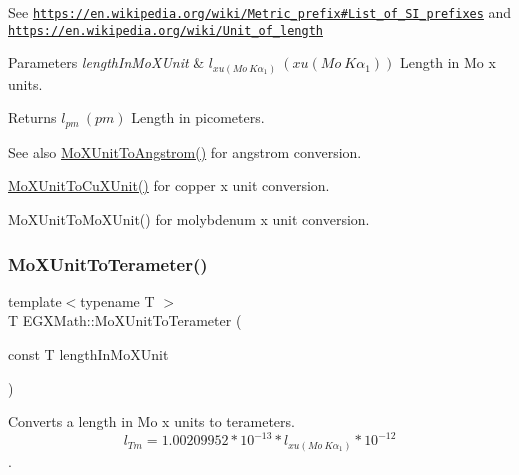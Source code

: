 See \href{https://en.wikipedia.org/wiki/Metric_prefix#List_of_SI_prefixes}{\tt https\+://en.\+wikipedia.\+org/wiki/\+Metric\+\_\+prefix\#\+List\+\_\+of\+\_\+\+S\+I\+\_\+prefixes} and \href{https://en.wikipedia.org/wiki/Unit_of_length}{\tt https\+://en.\+wikipedia.\+org/wiki/\+Unit\+\_\+of\+\_\+length} 
\begin{DoxyParams}{Parameters}
{\em length\+In\+Mo\+X\+Unit} & $ l_{xu(Mo\ K\alpha_1)}\ (xu(Mo\ K\alpha_1))$ Length in Mo x units. \\
\hline
\end{DoxyParams}
\begin{DoxyReturn}{Returns}
$ l_{pm}\ (pm)$ Length in picometers. 
\end{DoxyReturn}
\begin{DoxySeeAlso}{See also}
\mbox{\hyperlink{group___e_g_x_math-_conversions-_length_conversions-_non-_s_i-_mo_x_unit-_non-_s_i_ga1846652500863bdef905f209f3c5e0ae}{Mo\+X\+Unit\+To\+Angstrom()}} for angstrom conversion. 

\mbox{\hyperlink{group___e_g_x_math-_conversions-_length_conversions-_non-_s_i-_mo_x_unit-_non-_s_i_ga15685a2e91cbe4f0ae403ed1b4c9b9b4}{Mo\+X\+Unit\+To\+Cu\+X\+Unit()}} for copper x unit conversion. 

Mo\+X\+Unit\+To\+Mo\+X\+Unit() for molybdenum x unit conversion. 
\end{DoxySeeAlso}
\mbox{\label{group___e_g_x_math-_conversions-_length_conversions-_non-_s_i-_mo_x_unit-_s_i_ga8f6e4c8426fae89833534d8aac0b69c7}} 
\subsubsection{\texorpdfstring{Mo\+X\+Unit\+To\+Terameter()}{MoXUnitToTerameter()}}
{\footnotesize\ttfamily template$<$typename T $>$ \\
T E\+G\+X\+Math\+::\+Mo\+X\+Unit\+To\+Terameter (\begin{DoxyParamCaption}\item[{const T}]{length\+In\+Mo\+X\+Unit }\end{DoxyParamCaption})}



Converts a length in Mo x units to terameters. \[ l_{Tm}=1.00209952*10^{-13} * l_{xu(Mo\ K\alpha_1)} * 10^{-12} \]. 

